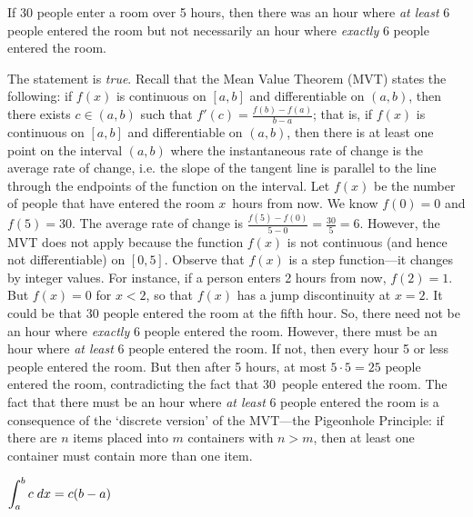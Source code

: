 \documentclass[11pt,letterpaper]{article}
\begin{document}
 If 30 people enter a room over 5 hours, then there was an hour where \textit{at least} 6 people entered the room but not necessarily an hour where \textit{exactly} 6 people entered the room. \pspace

\sol The statement is \textit{true}. Recall that the Mean Value Theorem (MVT) states the following: if $f(x)$ is continuous on $[a, b]$ and differentiable on $(a, b)$, then there exists $c \in (a, b)$ such that $f'(c)= \frac{f(b) - f(a)}{b - a}$; that is, if $f(x)$ is continuous on $[a, b]$ and differentiable on $(a, b)$, then there is at least one point on the interval $(a, b)$ where the instantaneous rate of change is the average rate of change, i.e. the slope of the tangent line is parallel to the line through the endpoints of the function on the interval. Let $f(x)$ be the number of people that have entered the room $x$~hours from now. We know $f(0)= 0$ and $f(5)= 30$. The average rate of change is $\frac{f(5) - f(0)}{5 - 0}= \frac{30}{5}= 6$. However, the MVT does not apply because the function $f(x)$ is not continuous (and hence not differentiable) on $[0, 5]$. Observe that $f(x)$ is a step function---it changes by integer values. For instance, if a person enters 2 hours from now, $f(2)= 1$. But $f(x)= 0$ for $x < 2$, so that $f(x)$ has a jump discontinuity at $x= 2$. It could be that 30 people entered the room at the fifth hour. So, there need not be an hour where \textit{exactly} 6 people entered the room. However, there must be an hour where \textit{at least} 6 people entered the room. If not, then every hour 5 or less people entered the room. But then after 5 hours, at most $5 \cdot 5= 25$ people entered the room, contradicting the fact that 30~people entered the room. The fact that there must be an hour where \textit{at least} 6 people entered the room is a consequence of the `discrete version' of the MVT---the Pigeonhole Principle: if there are $n$ items placed into $m$ containers with $n > m$, then at least one container must contain more than one item. \pvspace{1.3cm}



 $\displaystyle\int_a^b c \;dx= c(b - a)$ \pspace
\end{document}
